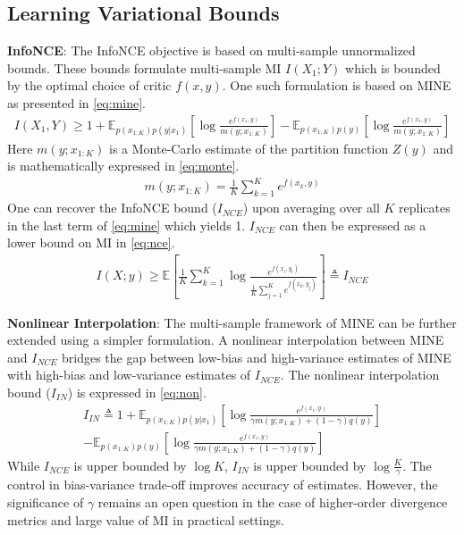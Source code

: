 \documentclass{article}
\begin{document}
\subsection{Learning Variational Bounds}
\textbf{InfoNCE}: The InfoNCE objective is based on multi-sample unnormalized bounds. These bounds formulate multi-sample MI $I(X_{1};Y)$ which is bounded by the optimal choice of critic $f(x,y)$. One such formulation is based on MINE \cite{mine} as presented in \autoref{eq:mine}.
\begin{gather}
  I(X_{1},Y) \geq 1 + \mathbb{E}_{p(x_{1:K})p(y|x_{1})}[\log\frac{e^{f(x_{1},y)}}{m(y;x_{1:K})}] - \mathbb{E}_{p(x_{1:K})p(y)}[\log\frac{e^{f(x_{1},y)}}{m(y;x_{1:K})}] \label{eq:mine}
\end{gather} 
Here $m(y;x_{1:K})$ is a Monte-Carlo estimate of the partition function $Z(y)$ and is mathematically expressed in \autoref{eq:monte}.
\begin{gather}
  m(y;x_{1:K}) = \frac{1}{K}\sum_{k=1}^{K}e^{f(x_{k},y)} \label{eq:monte}
\end{gather}
One can recover the InfoNCE bound ($I_{NCE}$) upon averaging over all $K$ replicates in the last term of \autoref{eq:mine} which yields 1. $I_{NCE}$ can then be expressed as a lower bound on MI in \autoref{eq:nce}.
\begin{gather}
  I(X;y) \geq \mathbb{E}[\frac{1}{K}\sum_{k=1}^{K}\log\frac{e^{f(x_{i},y_{i})}}{\frac{1}{K}\sum_{j=1}^{K}e^{f(x_{k},y_{j})}}] \triangleq I_{NCE} \label{eq:nce}
\end{gather} 

\textbf{Nonlinear Interpolation}: The multi-sample framework of MINE can be further extended using a simpler formulation. A nonlinear interpolation between MINE and $I_{NCE}$ bridges the gap between low-bias and high-variance estimates of MINE with high-bias and low-variance estimates of $I_{NCE}$. The nonlinear interpolation bound ($I_{IN}$) is expressed in \autoref{eq:non}.
\begin{multline}  
  I_{IN} \triangleq 1 + \mathbb{E}_{p(x_{1:K})p(y|x_{1})}[\log\frac{e^{f(x_{1},y)}}{\gamma m(y;x_{1:K})+(1-\gamma)q(y)}]\\ - \mathbb{E}_{p(x_{1:K})p(y)}[\log\frac{e^{f(x_{1},y)}}{\gamma m(y;x_{1:K})+(1-\gamma)q(y)}] \label{eq:non}
\end{multline}  
While $I_{NCE}$ is upper bounded by $\log K$, $I_{IN}$ is upper bounded by $\log \frac{K}{\gamma}$. The control in bias-variance trade-off improves accuracy of estimates. However, the significance of $\gamma$ remains an open question in the case of higher-order divergence metrics and large value of MI in practical settings. 
\end{document}
